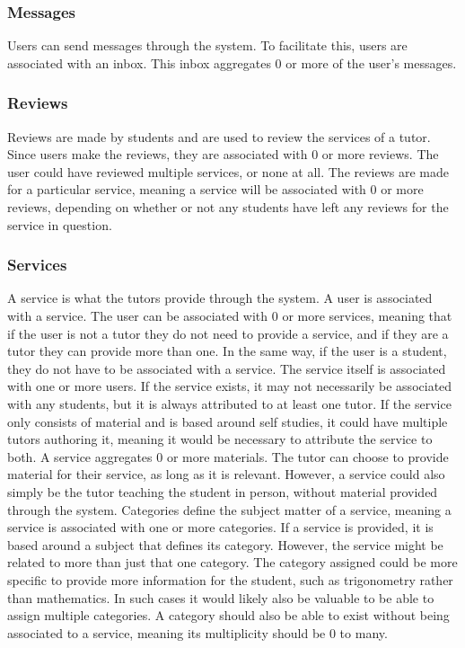 \subsubsection{Messages}
Users can send messages through the system.
To facilitate this, users are associated with an inbox.
This inbox aggregates 0 or more of the user's messages.

\subsubsection{Reviews}
Reviews are made by students and are used to review the services of a tutor.
Since users make the reviews, they are associated with 0 or more reviews.
The user could have reviewed multiple services, or none at all.
The reviews are made for a particular service, meaning a service will be associated with 0 or more reviews, depending on whether or not any students have left any reviews for the service in question.

\subsubsection{Services}
A service is what the tutors provide through the system.
A user is associated with a service.
The user can be associated with 0 or more services, meaning that if the user is not a tutor they do not need to provide a service, and if they are a tutor they can provide more than one. 
In the same way, if the user is a student, they do not have to be associated with a service.
The service itself is associated with one or more users.
If the service exists, it may not necessarily be associated with any students, but it is always attributed to at least one tutor.
If the service only consists of material and is based around self studies, it could have multiple tutors authoring it, meaning it would be necessary to attribute the service to both.
A service aggregates 0 or more materials.
The tutor can choose to provide material for their service, as long as it is relevant.
However, a service could also simply be the tutor teaching the student in person, without material provided through the system.
Categories define the subject matter of a service, meaning a service is associated with one or more categories.
If a service is provided, it is based around a subject that defines its category.
However, the service might be related to more than just that one category.
The category assigned could be more specific to provide more information for the student, such as trigonometry rather than mathematics.
In such cases it would likely also be valuable to be able to assign multiple categories.
A category should also be able to exist without being associated to a service, meaning its multiplicity should be 0 to many.